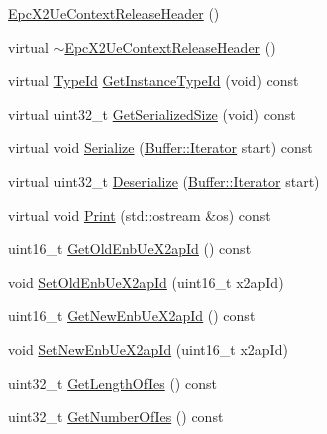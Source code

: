 \begin{DoxyCompactItemize}
\item 
\hyperlink{classns3_1_1EpcX2UeContextReleaseHeader_ac314302e711a1f041ed970f25935fb6e}{Epc\+X2\+Ue\+Context\+Release\+Header} ()
\item 
virtual \hyperlink{classns3_1_1EpcX2UeContextReleaseHeader_aac5f3c13b1a068f10aed21ea128dc3fd}{$\sim$\+Epc\+X2\+Ue\+Context\+Release\+Header} ()
\item 
virtual \hyperlink{classns3_1_1TypeId}{Type\+Id} \hyperlink{classns3_1_1EpcX2UeContextReleaseHeader_adf1199ce46d33a1895a1bf4fe7f97133}{Get\+Instance\+Type\+Id} (void) const 
\item 
virtual uint32\+\_\+t \hyperlink{classns3_1_1EpcX2UeContextReleaseHeader_a2c9c2dc98cc109efef8982b50fa717d6}{Get\+Serialized\+Size} (void) const 
\item 
virtual void \hyperlink{classns3_1_1EpcX2UeContextReleaseHeader_a6adf36442f6950420593cece775710ca}{Serialize} (\hyperlink{classns3_1_1Buffer_1_1Iterator}{Buffer\+::\+Iterator} start) const 
\item 
virtual uint32\+\_\+t \hyperlink{classns3_1_1EpcX2UeContextReleaseHeader_aeaf50d5f4b8d690c3199d59572fc2413}{Deserialize} (\hyperlink{classns3_1_1Buffer_1_1Iterator}{Buffer\+::\+Iterator} start)
\item 
virtual void \hyperlink{classns3_1_1EpcX2UeContextReleaseHeader_a50807a150fff9c8bdc4647a311a7e952}{Print} (std\+::ostream \&os) const 
\item 
uint16\+\_\+t \hyperlink{classns3_1_1EpcX2UeContextReleaseHeader_a6ccf72aeca771a8a17207821a705a3c5}{Get\+Old\+Enb\+Ue\+X2ap\+Id} () const 
\item 
void \hyperlink{classns3_1_1EpcX2UeContextReleaseHeader_a912e7234631e705a0ee3dd83b1174d25}{Set\+Old\+Enb\+Ue\+X2ap\+Id} (uint16\+\_\+t x2ap\+Id)
\item 
uint16\+\_\+t \hyperlink{classns3_1_1EpcX2UeContextReleaseHeader_a6e36f9110312f96be9481a34356d5a71}{Get\+New\+Enb\+Ue\+X2ap\+Id} () const 
\item 
void \hyperlink{classns3_1_1EpcX2UeContextReleaseHeader_a49d38a343e8cf77d7fce53bc184fc567}{Set\+New\+Enb\+Ue\+X2ap\+Id} (uint16\+\_\+t x2ap\+Id)
\item 
uint32\+\_\+t \hyperlink{classns3_1_1EpcX2UeContextReleaseHeader_a682f782d57cc4c614a073e434fc89b57}{Get\+Length\+Of\+Ies} () const 
\item 
uint32\+\_\+t \hyperlink{classns3_1_1EpcX2UeContextReleaseHeader_a53c7b382a7dba8e79d2f1d4723cfaa85}{Get\+Number\+Of\+Ies} () const 
\end{DoxyCompactItemize}
